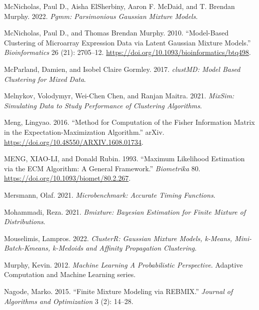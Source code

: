 \begin{CSLReferences}{1}{0}
\leavevmode{}%
McNicholas, Paul D., Aisha ElSherbiny, Aaron F. McDaid, and T. Brendan Murphy. 2022. \emph{Pgmm: Parsimonious Gaussian Mixture Models}.

\leavevmode{}%
McNicholas, Paul D., and Thomas Brendan Murphy. 2010. {``Model-Based Clustering of Microarray Expression Data via Latent Gaussian Mixture Models.''} \emph{Bioinformatics} 26 (21): 2705--12. \url{https://doi.org/10.1093/bioinformatics/btq498}.

\leavevmode{}%
McParland, Damien, and Isobel Claire Gormley. 2017. \emph{clustMD: Model Based Clustering for Mixed Data}.

\leavevmode{}%
Melnykov, Volodymyr, Wei-Chen Chen, and Ranjan Maitra. 2021. \emph{MixSim: Simulating Data to Study Performance of Clustering Algorithms}.

\leavevmode{}%
Meng, Lingyao. 2016. {``Method for Computation of the Fisher Information Matrix in the Expectation-Maximization Algorithm.''} arXiv. \url{https://doi.org/10.48550/ARXIV.1608.01734}.

\leavevmode{}%
MENG, XIAO-LI, and Donald Rubin. 1993. {``Maximum {Likelihood Estimation} via the {ECM Algorithm}: {A General Framework}.''} \emph{Biometrika} 80. \url{https://doi.org/10.1093/biomet/80.2.267}.

\leavevmode{}%
Mersmann, Olaf. 2021. \emph{Microbenchmark: Accurate Timing Functions}.

\leavevmode{}%
Mohammadi, Reza. 2021. \emph{Bmixture: Bayesian Estimation for Finite Mixture of Distributions}.

\leavevmode{}%
Mouselimis, Lampros. 2022. \emph{ClusterR: Gaussian Mixture Models, k-Means, Mini-Batch-Kmeans, k-Medoids and Affinity Propagation Clustering}.

\leavevmode{}%
Murphy, Kevin. 2012. \emph{Machine {Learning A Probabilistic Perspective}}. {Adaptive Computation and Machine Learning series}.

\leavevmode{}%
Nagode, Marko. 2015. {``Finite Mixture Modeling via REBMIX.''} \emph{Journal of Algorithms and Optimization} 3 (2): 14--28.


\end{CSLReferences}
